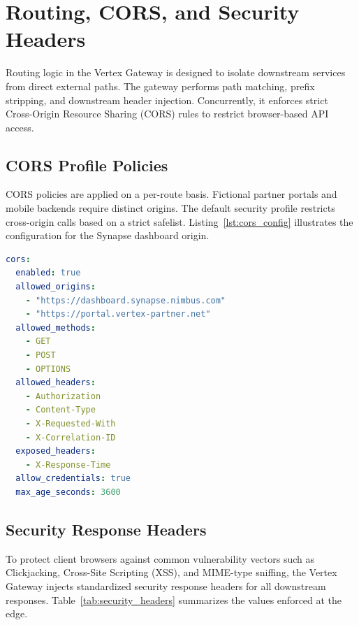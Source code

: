 \section{Routing, CORS, and Security Headers}
\label{sec:routing_cors}

Routing logic in the Vertex Gateway is designed to isolate downstream services from direct external paths. The gateway performs path matching, prefix stripping, and downstream header injection. Concurrently, it enforces strict Cross-Origin Resource Sharing (CORS) rules to restrict browser-based API access.

\subsection{CORS Profile Policies}
CORS policies are applied on a per-route basis. Fictional partner portals and mobile backends require distinct origins. The default security profile restricts cross-origin calls based on a strict safelist. Listing~\ref{lst:cors_config} illustrates the configuration for the Synapse dashboard origin.

\begin{lstlisting}[language=yaml, caption={CORS policy configuration block for public enterprise dashboards.}, label={lst:cors_config}]
cors:
  enabled: true
  allowed_origins:
    - "https://dashboard.synapse.nimbus.com"
    - "https://portal.vertex-partner.net"
  allowed_methods:
    - GET
    - POST
    - OPTIONS
  allowed_headers:
    - Authorization
    - Content-Type
    - X-Requested-With
    - X-Correlation-ID
  exposed_headers:
    - X-Response-Time
  allow_credentials: true
  max_age_seconds: 3600
\end{lstlisting}

\subsection{Security Response Headers}
To protect client browsers against common vulnerability vectors such as Clickjacking, Cross-Site Scripting (XSS), and MIME-type sniffing, the Vertex Gateway injects standardized security response headers for all downstream responses. Table~\ref{tab:security_headers} summarizes the values enforced at the edge.


